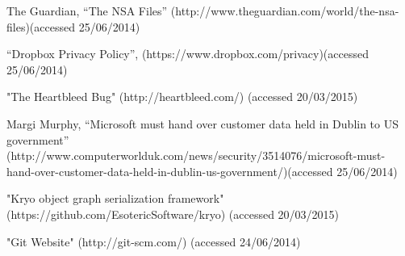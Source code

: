 \documentclass[12pt,a4paper,]{adreport}
\begin{document}
\begin{thebibliography}{9}
 The Guardian, ``The NSA Files''
  (http://www.theguardian.com/world/the-nsa-files)(accessed 25/06/2014)
  
 ``Dropbox
  Privacy Policy'', (https://www.dropbox.com/privacy)(accessed
  25/06/2014)

 "The Heartbleed Bug" (http://heartbleed.com/) (accessed 20/03/2015)

 Margi Murphy, ``Microsoft must hand over customer
  data held in Dublin to US government''
  (http://www.computerworlduk.com/news/security/3514076/microsoft-must-hand-over-customer-data-held-in-dublin-us-government/)(accessed
  25/06/2014)

 "Kryo object graph serialization framework" (https://github.com/EsotericSoftware/kryo) (accessed 20/03/2015)

 "Git Website" (http://git-scm.com/) (accessed 24/06/2014)


\end{thebibliography}
\end{document}
